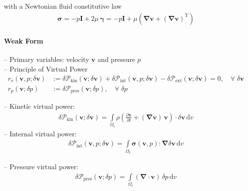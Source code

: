 \documentclass[a4paper,12pt]{report}
\newcommand{\bs}[1]{\boldsymbol{#1}}
\newcommand{\Om}{\mathit{\Omega}}
\begin{document}
with a Newtonian fluid constitutive law
\begin{align}
\bs{\sigma} = -p \bs{I} + 2 \mu\,\bs{\gamma} = -p \bs{I} + \mu \left(\bs{\nabla} \bs{v} + (\bs{\nabla} \bs{v})^{\mathrm{T}}\right)
\end{align}

\paragraph{Weak Form}
-- Primary variables: velocity $\bs{v}$ and pressure $p$\\

-- Principle of Virtual Power
\begin{align}
r_v(\bs{v},p;\delta\bs{v}) &:= \delta \mathcal{P}_{\mathrm{kin}}(\bs{v};\delta\bs{v}) + \delta \mathcal{P}_{\mathrm{int}}(\bs{v},p;\delta\bs{v}) - \delta \mathcal{P}_{\mathrm{ext}}(\bs{v};\delta\bs{v}) = 0, \quad \forall \; \delta\bs{v} \label{eq:res_v_fluid}\\
r_p(\bs{v};\delta p) &:= \delta \mathcal{P}_{\mathrm{pres}}(\bs{v};\delta p), \quad \forall \; \delta p \label{eq:res_p_fluid}
\end{align}

-- Kinetic virtual power:
\begin{align}
\delta \mathcal{P}_{\mathrm{kin}}(\bs{v};\delta\bs{v}) = \int\limits_{\Om_t} \rho\left(\frac{\partial\bs{v}}{\partial t} + (\bs{\nabla}\bs{v})\,\bs{v}\right) \cdot \delta\bs{v} \,\mathrm{d}v
\end{align}
-- Internal virtual power:
\begin{align}
\delta \mathcal{P}_{\mathrm{int}}(\bs{v},p;\delta\bs{v}) = 
\int\limits_{\Om_t} \bs{\sigma}(\bs{v},p) : \bs{\nabla} \delta\bs{v} \,\mathrm{d}v 
\end{align}

-- Pressure virtual power:
\begin{align}
\delta \mathcal{P}_{\mathrm{pres}}(\bs{v};\delta p) = 
\int\limits_{\Om_t} (\bs{\nabla}\cdot\bs{v})\,\delta p\,\mathrm{d}v
\end{align}
\end{document}
